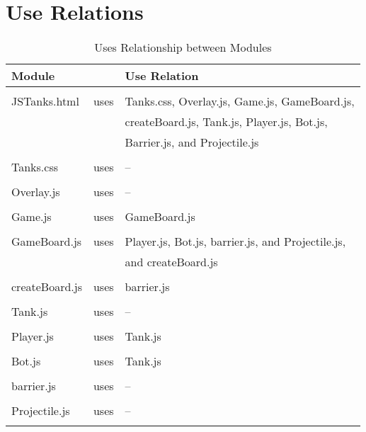 \documentclass{article}
\begin{document}
\section{Use Relations}
\begin{table}[!h]
\begin{tabular}{lll}
Module && Use Relation \\ 
\hline \\
JSTanks.html & uses & Tanks.css, Overlay.js, Game.js, GameBoard.js, \\  
&&createBoard.js, Tank.js, Player.js, Bot.js,\\
&& Barrier.js, and Projectile.js \\ \\
Tanks.css & uses & -- \\ \\
Overlay.js & uses & -- \\ \\
Game.js & uses & GameBoard.js \\ \\
GameBoard.js & uses & Player.js, Bot.js, barrier.js, and Projectile.js, \\
&&and createBoard.js \\ \\
createBoard.js & uses & barrier.js \\ \\
Tank.js & uses & -- \\ \\
Player.js & uses & Tank.js \\ \\
Bot.js & uses & Tank.js \\ \\
barrier.js & uses & -- \\ \\
Projectile.js & uses & -- \\ \\
\hline
\end{tabular}
\caption {Uses Relationship between Modules}
\end{table}


\newpage
\listoftables
\listoffigures
\end{document}
